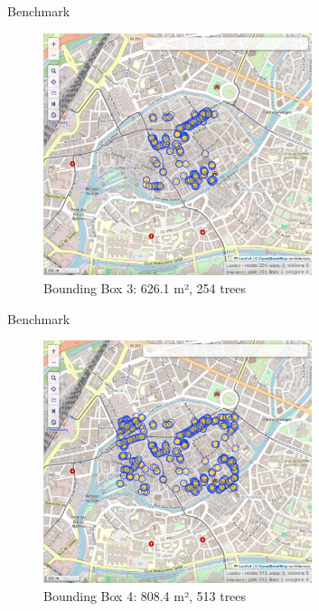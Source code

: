 \documentclass[10pt]{beamer}
\begin{document}
\begin{frame}{Benchmark}
  \Large
  \begin{figure}[H]
    \centering
    \includegraphics[width=0.7\textwidth]{images/bbox3.png}
    \caption{Bounding Box 3: 626.1 m², 254 trees}
\end{figure}
\end{frame}

\begin{frame}{Benchmark}
  \Large
  \begin{figure}[H]
    \centering
    \includegraphics[width=0.7\textwidth]{images/bbox4.png}
    \caption{Bounding Box 4: 808.4 m², 513 trees}
\end{figure}
\end{frame}
\end{document}
